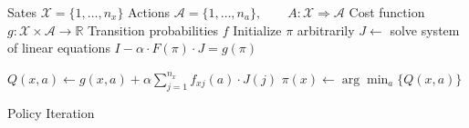 \documentclass{article}
\begin{document}
\begin{preview}
    \begin{algorithm}[H]
        \begin{algorithmic}
        \Require
        \Statex Sates $\mathcal{X} = \{1, \dots, n_x\}$
        \Statex Actions $\mathcal{A} = \{1, \dots, n_a\},\qquad A: \mathcal{X} \Rightarrow \mathcal{A}$
        \Statex Cost function $g: \mathcal{X} \times \mathcal{A} \rightarrow \mathbb{R}$
        \Statex Transition probabilities $f$
            \State Initialize $\pi$ arbitrarily
                \State $J \gets$ solve system of linear equations $I - \alpha \cdot F(\pi) \cdot J = g(\pi)$

                        \State $Q(x, a) \gets g(x, a) + \alpha \sum_{j=1}^{n_x} f_{xj}(a) \cdot J(j)$
                    \EndFor
                \EndFor
                    \State $\pi(x) \gets \arg \min_a \{Q(x, a)\}$
                \EndFor
            \EndWhile
        \EndProcedure
        \end{algorithmic}
    \caption{Policy Iteration}
    \label{alg:policy-iteration}
    \end{algorithm}
\end{preview}
\end{document}
